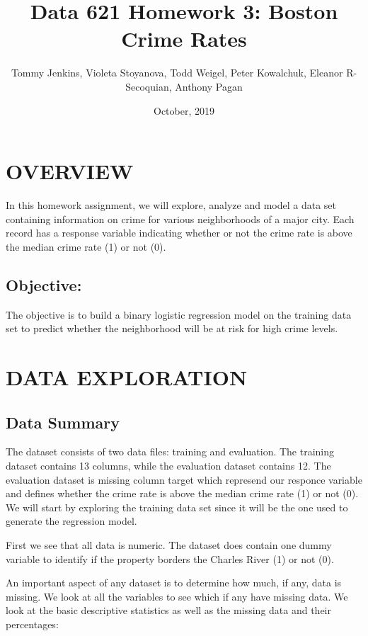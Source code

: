 \documentclass[
]{article}
\title{Data 621 Homework 3: Boston Crime Rates}
\author{Tommy Jenkins, Violeta Stoyanova, Todd Weigel, Peter Kowalchuk, Eleanor
R-Secoquian, Anthony Pagan}
\date{October, 2019}
\begin{document}
\maketitle

\hypertarget{overview}{%
\section{OVERVIEW}\label{overview}}

In this homework assignment, we will explore, analyze and model a data
set containing information on crime for various neighborhoods of a major
city. Each record has a response variable indicating whether or not the
crime rate is above the median crime rate (1) or not (0).

\hypertarget{objective}{%
\subsection{Objective:}\label{objective}}

The objective is to build a binary logistic regression model on the
training data set to predict whether the neighborhood will be at risk
for high crime levels.

\hypertarget{data-exploration}{%
\section{DATA EXPLORATION}\label{data-exploration}}

\hypertarget{data-summary}{%
\subsection{Data Summary}\label{data-summary}}

The dataset consists of two data files: training and evaluation. The
training dataset contains 13 columns, while the evaluation dataset
contains 12. The evaluation dataset is missing column target which
represend our responce variable and defines whether the crime rate is
above the median crime rate (1) or not (0). We will start by exploring
the training data set since it will be the one used to generate the
regression model.

First we see that all data is numeric. The dataset does contain one
dummy variable to identify if the property borders the Charles River (1)
or not (0).

An important aspect of any dataset is to determine how much, if any,
data is missing. We look at all the variables to see which if any have
missing data. We look at the basic descriptive statistics as well as the
missing data and their percentages:
\end{document}
